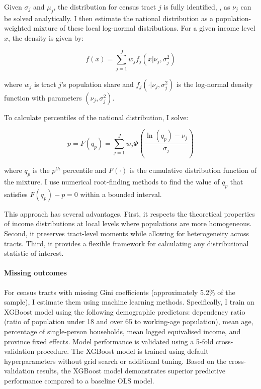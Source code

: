 Given $\sigma_j$ and $\mu_j$, the distribution for census tract $j$ is fully identified, , as $\nu_j$ can be solved analytically. I then estimate the national distribution as a population-weighted mixture of these local log-normal distributions. For a given income level $x$, the density is given by:

\begin{equation}
f(x) = \sum_{j=1}^{J} w_j f_j(x|\nu_j,\sigma_j^2)
\end{equation}

where $w_j$ is tract $j$'s population share and $f_j(\cdot|\nu_j,\sigma_j^2)$ is the log-normal density function with parameters $(\nu_j,\sigma_j^2)$.

To calculate percentiles of the national distribution, I solve:

\begin{equation}
p = F(q_p) = \sum_{j=1}^{J} w_j \Phi\left(\frac{\ln(q_p) - \nu_j}{\sigma_j}\right)
\end{equation}

where $q_p$ is the $p^{th}$ percentile and $F(\cdot)$ is the cumulative distribution function of the mixture. I use numerical root-finding methods to find the value of $q_p$ that satisfies $F(q_p) - p = 0$ within a bounded interval.

This approach has several advantages. First, it respects the theoretical properties of income distributions at local levels where populations are more homogeneous. Second, it preserves tract-level moments while allowing for heterogeneity across tracts. Third, it provides a flexible framework for calculating any distributional statistic of interest.

\paragraph{Missing outcomes} For census tracts with missing Gini coefficients (approximately 5.2\% of the sample), I estimate them using machine learning methods. Specifically, I train an XGBoost model using the following demographic predictors: dependency ratio (ratio of population under 18 and over 65 to working-age population), mean age, percentage of single-person households, mean logged equivalised income, and province fixed effects. Model performance is validated using a 5-fold cross-validation procedure. The XGBoost model is trained using default hyperparameters without grid search or additional tuning. Based on the cross-validation results, the XGBoost model demonstrates superior predictive performance compared to a baseline OLS model.


